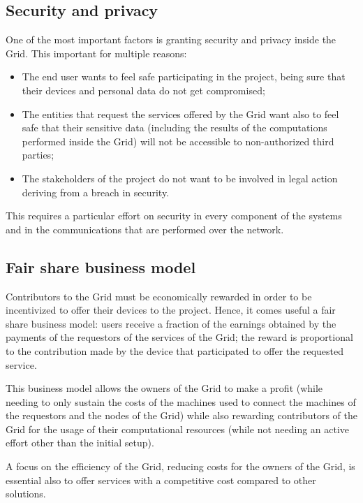 \subsection{Security and privacy}
One of the most important factors is granting security and privacy inside the Grid. This important for multiple reasons:
\begin{itemize}
    \item The end user wants to feel safe participating in the project, being sure that their devices and personal data do not get compromised;
    \item The entities that request the services offered by the Grid want also to feel safe that their sensitive data (including the results of the computations performed inside the Grid) will not be accessible to non-authorized third parties;
    \item The stakeholders of the project do not want to be involved in legal action deriving from a breach in security.
\end{itemize}

This requires a particular effort on security in every component of the systems and in the communications that are performed over the network.

\subsection{Fair share business model}
Contributors to the Grid must be economically rewarded in order to be incentivized to offer their devices to the project. Hence, it comes useful a fair share business model: users receive a fraction of the earnings obtained by the payments of the requestors of the services of the Grid; the reward is proportional to the contribution made by the device that participated to offer the requested service.

This business model allows the owners of the Grid to make a profit (while needing to only sustain the costs of the machines used to connect the machines of the requestors and the nodes of the Grid) while also rewarding contributors of the Grid for the usage of their computational resources (while not needing an active effort other than the initial setup).

A focus on the efficiency of the Grid, reducing costs for the owners of the Grid, is essential also to offer services with a competitive cost compared to other solutions.

